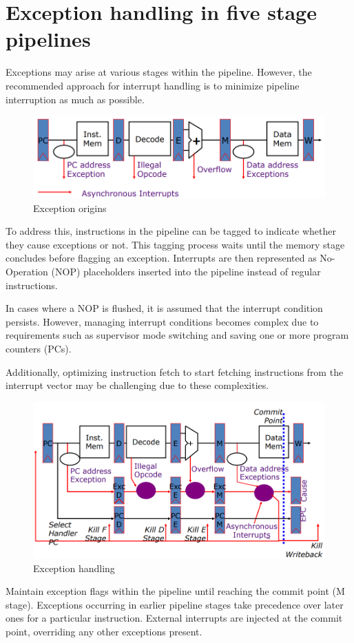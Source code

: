 \section{Exception handling in five stage pipelines}

Exceptions may arise at various stages within the pipeline. 
However, the recommended approach for interrupt handling is to minimize pipeline interruption as much as possible.
\begin{figure}[H]
    \centering
    \includegraphics[width=0.5\linewidth]{images/5s.png}
    \caption{Exception origins}
\end{figure}
To address this, instructions in the pipeline can be tagged to indicate whether they cause exceptions or not. 
This tagging process waits until the memory stage concludes before flagging an exception. 
Interrupts are then represented as No-Operation (NOP) placeholders inserted into the pipeline instead of regular instructions.

In cases where a NOP is flushed, it is assumed that the interrupt condition persists.
However, managing interrupt conditions becomes complex due to requirements such as supervisor mode switching and saving one or more program counters (PCs).

Additionally, optimizing instruction fetch to start fetching instructions from the interrupt vector may be challenging due to these complexities.
\begin{figure}[H]
    \centering
    \includegraphics[width=0.5\linewidth]{images/5s2.png}
    \caption{Exception handling}
\end{figure}
Maintain exception flags within the pipeline until reaching the commit point (M stage). 
Exceptions occurring in earlier pipeline stages take precedence over later ones for a particular instruction. 
External interrupts are injected at the commit point, overriding any other exceptions present.


